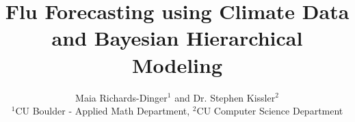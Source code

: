 \documentclass[final,t]{beamer}
\title{\huge Flu Forecasting using Climate Data and Bayesian Hierarchical Modeling}
\author[]{\Large Maia Richards-Dinger$^1$ and Dr. Stephen Kissler$^2$ \\
\small$^1$CU Boulder - Applied Math Department, $^2$CU Computer Science Department}
\begin{document}
\begin{frame}{}
	\begin{columns}[t]
		\begin{column}{.31\linewidth}
			
		\end{column}
        
		\begin{column}{.3\linewidth}
			
		\end{column}
		
		\begin{column}{.3\linewidth}
			 
		\end{column}
	\end{columns}   
\end{frame}
\end{document}

